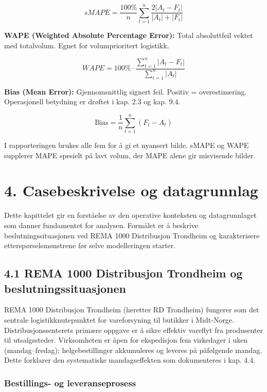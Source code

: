 \documentclass[
  norsk,
  11pt,
  a4paper,
]{article}
\begin{document}
\[sMAPE = \frac{100\%}{n} \sum_{t=1}^{n} \frac{2|A_t - F_t|}{|A_t| + |F_t|}\]

\textbf{WAPE (Weighted Absolute Percentage Error):} Total absoluttfeil
vektet med totalvolum. Egnet for volumprioritert logistikk.

\[WAPE = 100\% \cdot \frac{\sum_{t=1}^{n} |A_t - F_t|}{\sum_{t=1}^{n} |A_t|}\]

\textbf{Bias (Mean Error):} Gjennomsnittlig signert feil. Positiv =
overestimering. Operasjonell betydning er drøftet i kap. 2.3 og kap.
9.4.

\[\text{Bias} = \frac{1}{n} \sum_{t=1}^{n} (F_t - A_t)\]

I rapporteringen brukes alle fem for å gi et nyansert bilde. sMAPE og
WAPE supplerer MAPE spesielt på lavt volum, der MAPE alene gir
misvisende bilder.

\section{4. Casebeskrivelse og
datagrunnlag}\label{casebeskrivelse-og-datagrunnlag}

Dette kapittelet gir en forståelse av den operative konteksten og
datagrunnlaget som danner fundamentet for analysen. Formålet er å
beskrive beslutningssituasjonen ved REMA 1000 Distribusjon Trondheim og
karakterisere etterspørselsmønstrene før selve modelleringen starter.

\subsection{4.1 REMA 1000 Distribusjon Trondheim og
beslutningssituasjonen}\label{rema-1000-distribusjon-trondheim-og-beslutningssituasjonen}

REMA 1000 Distribusjon Trondheim (heretter RD Trondheim) fungerer som
det sentrale logistikknutepunktet for vareforsyning til butikker i
Midt-Norge. Distribusjonssenterets primære oppgave er å sikre effektiv
vareflyt fra produsenter til utsalgssteder. Virksomheten er åpen for
ekspedisjon fem virkedager i uken (mandag--fredag); helgebestillinger
akkumuleres og leveres på påfølgende mandag. Dette forklarer den
systematiske mandagseffekten som dokumenteres i kap. 4.4.

\subsubsection{Bestillings- og
leveranseprosess}\label{bestillings--og-leveranseprosess}
\end{document}
